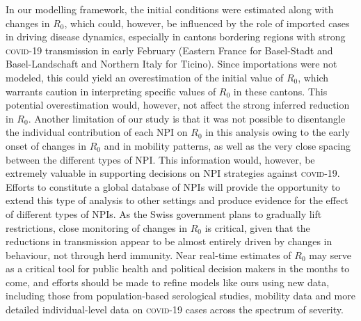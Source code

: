   In our modelling framework, the initial conditions were estimated along with changes in $R_0$, which could, however, be influenced by the role of imported cases in driving disease dynamics, especially in cantons bordering regions with strong \textsc{covid}-19 transmission in early February (Eastern France for Basel-Stadt and Basel-Landschaft and Northern Italy for Ticino). 
  Since importations were not modeled, this could yield an overestimation of the initial value of $R_0$, which warrants caution in interpreting specific values of $R_0$ in these cantons. This potential overestimation would, however, not affect the strong inferred reduction in $R_0$. Another limitation of our study is that it was not possible to disentangle the individual contribution of each NPI on $R_0$ in this analysis owing to the early onset of changes in $R_0$ and in mobility patterns, as well as the very close spacing between the different types of NPI. This information would, however, be extremely valuable in supporting decisions on NPI strategies against \textsc{covid}-19. Efforts to constitute a global database of NPIs will provide the opportunity to extend this type of analysis to other settings and produce evidence for the effect of different types of NPIs\cite{HITCOVIDTeam:HealthInterventionsTracking:2020}. As the Swiss government plans to gradually lift restrictions, close monitoring of changes in $R_0$ is critical, given that the reductions in transmission appear to be almost entirely driven by changes in behaviour, not through herd immunity. Near real-time estimates of $R_0$ may serve as a critical tool for public health and political decision makers in the months to come, and efforts should be made to refine models like ours using new data, including those from population-based serological studies, mobility data and more detailed individual-level data on \textsc{covid}-19 cases across the spectrum of severity.

